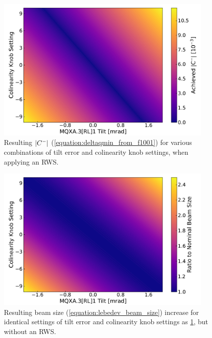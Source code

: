\begin{figure}[!htb]
    \centering
    \includegraphics*[width=0.95\textwidth]{Figures/IR_Coupling_Correction/cminus_colin_tilt_compensation_with_waist.pdf}
    \caption{Resulting \(\left\lvert C^{-} \right\rvert\) (\cref{equation:deltaqmin_from_f1001}) for various combinations of tilt error and colinearity knob settings, when applying an RWS.}
    \label{figure:cminus_colin_vs_tilt_with_waist}
\end{figure}

\begin{figure}[!htb]
    \centering
    \includegraphics*[width=0.95\textwidth]{Figures/IR_Coupling_Correction/ip_beam_size_growth_colin_tilt_compensation_no_waist.pdf}
    \caption{Resulting beam size (\cref{equation:lebedev_beam_size}) increase for identical settings of tilt error and colinearity knob settings as \cref{figure:cminus_colin_vs_tilt_with_waist}, but without an RWS.}
    \label{figure:beam_size_colin_vs_tilt_no_waist}
\end{figure}

